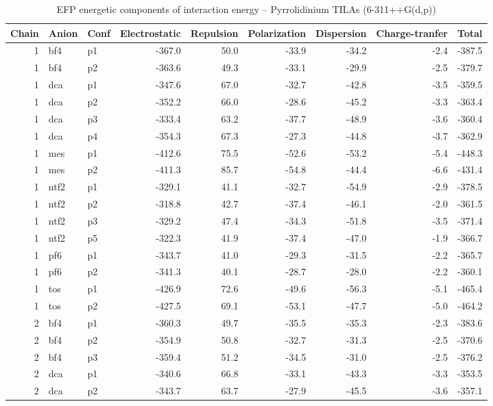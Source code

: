 \documentclass[a4paper]{article}
\begin{document}
\begin{table}[ht]
\centering
\scriptsize
\caption{EFP energetic components of interaction energy -- Pyrrolidinium TILAs (6-311++G(d,p))}
\begin{tabular}{rllrrrrrr}
  \hline
Chain & Anion & Conf & Electrostatic & Repulsion & Polarization & Dispersion & Charge-tranfer & Total \\ 
  \hline
 1 & bf4 & p1 & -367.0 & 50.0 & -33.9 & -34.2 & -2.4 & -387.5 \\ 
   1 & bf4 & p2 & -363.6 & 49.3 & -33.1 & -29.9 & -2.5 & -379.7 \\ 
   1 & dca & p1 & -347.6 & 67.0 & -32.7 & -42.8 & -3.5 & -359.5 \\ 
   1 & dca & p2 & -352.2 & 66.0 & -28.6 & -45.2 & -3.3 & -363.4 \\ 
   1 & dca & p3 & -333.4 & 63.2 & -37.7 & -48.9 & -3.6 & -360.4 \\ 
   1 & dca & p4 & -354.3 & 67.3 & -27.3 & -44.8 & -3.7 & -362.9 \\ 
   1 & mes & p1 & -412.6 & 75.5 & -52.6 & -53.2 & -5.4 & -448.3 \\ 
   1 & mes & p2 & -411.3 & 85.7 & -54.8 & -44.4 & -6.6 & -431.4 \\ 
   1 & ntf2 & p1 & -329.1 & 41.1 & -32.7 & -54.9 & -2.9 & -378.5 \\ 
   1 & ntf2 & p2 & -318.8 & 42.7 & -37.4 & -46.1 & -2.0 & -361.5 \\ 
   1 & ntf2 & p3 & -329.2 & 47.4 & -34.3 & -51.8 & -3.5 & -371.4 \\ 
   1 & ntf2 & p5 & -322.3 & 41.9 & -37.4 & -47.0 & -1.9 & -366.7 \\ 
   1 & pf6 & p1 & -343.7 & 41.0 & -29.3 & -31.5 & -2.2 & -365.7 \\ 
   1 & pf6 & p2 & -341.3 & 40.1 & -28.7 & -28.0 & -2.2 & -360.1 \\ 
   1 & tos & p1 & -426.9 & 72.6 & -49.6 & -56.3 & -5.1 & -465.4 \\ 
   1 & tos & p2 & -427.5 & 69.1 & -53.1 & -47.7 & -5.0 & -464.2 \\ 
   2 & bf4 & p1 & -360.3 & 49.7 & -35.5 & -35.3 & -2.3 & -383.6 \\ 
   2 & bf4 & p2 & -354.9 & 50.8 & -32.7 & -31.3 & -2.5 & -370.6 \\ 
   2 & bf4 & p3 & -359.4 & 51.2 & -34.5 & -31.0 & -2.5 & -376.2 \\ 
   2 & dca & p1 & -340.6 & 66.8 & -33.1 & -43.3 & -3.3 & -353.5 \\ 
   2 & dca & p2 & -343.7 & 63.7 & -27.9 & -45.5 & -3.6 & -357.1 \\ 

\end{tabular}
\end{table}
\end{document}
